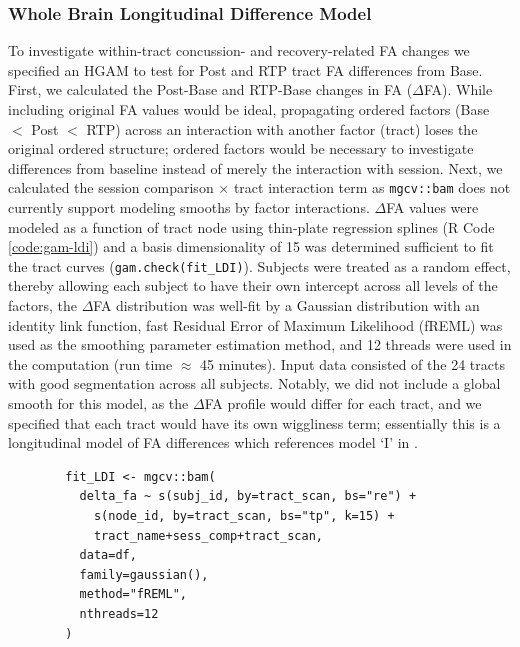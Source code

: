 \documentclass[12pt]{article}
\begin{document}
\subsubsection{Whole Brain Longitudinal Difference Model}
\label{sssec:meth-gam-ldi}
To investigate within-tract concussion- and recovery-related FA changes we specified an HGAM to test for Post and RTP tract FA differences from Base. First, we calculated the Post-Base and RTP-Base changes in FA ($\Delta$FA). While including original FA values would be ideal, propagating ordered factors (Base $<$ Post $<$ RTP) across an interaction with another factor (tract) loses the original ordered structure; ordered factors would be necessary to investigate differences from baseline instead of merely the interaction with session. Next, we calculated the session comparison $\times$ tract interaction term as \lstinline{mgcv::bam} does not currently support modeling smooths by factor interactions. $\Delta$FA values were modeled as a function of tract node using thin-plate regression splines (R Code \ref{code:gam-ldi}) and a basis dimensionality of 15 was determined sufficient to fit the tract curves (\lstinline{gam.check(fit_LDI)}). Subjects were treated as a random effect, thereby allowing each subject to have their own intercept across all levels of the factors, the $\Delta$FA distribution was well-fit by a Gaussian distribution with an identity link function, fast Residual Error of Maximum Likelihood (fREML) was used as the smoothing parameter estimation method, and 12 threads were used in the computation (run time $\approx$ 45 minutes). Input data consisted of the 24 tracts with good segmentation across all subjects. Notably, we did not include a global smooth for this model, as the $\Delta$FA profile would differ for each tract, and we specified that each tract would have its own wiggliness term; essentially this is a longitudinal model of FA differences which references model `I' in \textcite{pedersen2019HierarchicalGeneralizedAdditive}.

\begin{equ}[H]
	\begin{lstlisting}
		fit_LDI <- mgcv::bam(
		  delta_fa ~ s(subj_id, by=tract_scan, bs="re") +
		    s(node_id, by=tract_scan, bs="tp", k=15) +
		    tract_name+sess_comp+tract_scan,
		  data=df,
		  family=gaussian(),
		  method="fREML",
		  nthreads=12
		)
	\end{lstlisting}
	\caption{$\Delta$FA values are modeled as a function of tract node with thin-plate regression smooths for each tract, accounting for the within-subject factors of tract and session and using separate wiggliness terms for each tract. \lstinline{delta_fa} = RTP-Base and Post-Base FA differences, \lstinline{subj_id} = subject identifier factor, \lstinline{node_id} = node identifier integer, \lstinline{tract_name} = tract identifier factor, \lstinline{sess_comp} = session comparison factor (RTP-Base, Post-Base), and \lstinline{tract_scan} = interaction of \lstinline{tract_name} and \lstinline{sess_comp}.}
	\label{code:gam-ldi}
\end{equ}
\end{document}
